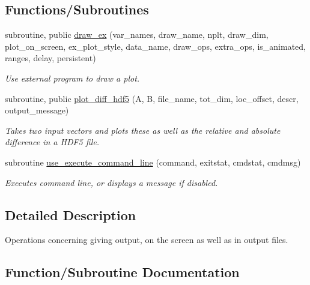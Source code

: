 \subsection*{Functions/\+Subroutines}
\begin{DoxyCompactItemize}
\item 
subroutine, public \hyperlink{namespaceoutput__ops_a50bfbb88cc91805469353c3ff47b3e2e}{draw\+\_\+ex} (var\+\_\+names, draw\+\_\+name, nplt, draw\+\_\+dim, plot\+\_\+on\+\_\+screen, ex\+\_\+plot\+\_\+style, data\+\_\+name, draw\+\_\+ops, extra\+\_\+ops, is\+\_\+animated, ranges, delay, persistent)
\begin{DoxyCompactList}\small\item\em Use external program to draw a plot. \end{DoxyCompactList}\item 
subroutine, public \hyperlink{namespaceoutput__ops_ab0d14194d01ab0534562eab50b37a57a}{plot\+\_\+diff\+\_\+hdf5} (A, B, file\+\_\+name, tot\+\_\+dim, loc\+\_\+offset, descr, output\+\_\+message)
\begin{DoxyCompactList}\small\item\em Takes two input vectors and plots these as well as the relative and absolute difference in a H\+D\+F5 file. \end{DoxyCompactList}\item 
subroutine \hyperlink{namespaceoutput__ops_aa9e4855511b6ea16a08b3efb587bec51}{use\+\_\+execute\+\_\+command\+\_\+line} (command, exitstat, cmdstat, cmdmsg)
\begin{DoxyCompactList}\small\item\em Executes command line, or displays a message if disabled. \end{DoxyCompactList}\end{DoxyCompactItemize}


\subsection{Detailed Description}
Operations concerning giving output, on the screen as well as in output files. 

\subsection{Function/\+Subroutine Documentation}
\mbox{\label{namespaceoutput__ops_a50bfbb88cc91805469353c3ff47b3e2e}} 
